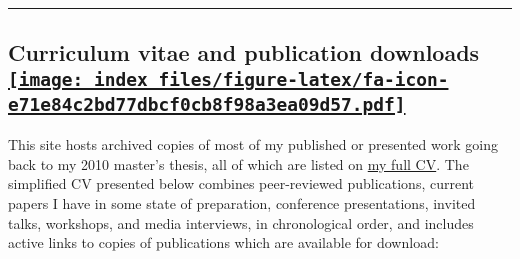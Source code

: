 \documentclass[
]{article}
\begin{document}
\begin{center}\rule{0.5\linewidth}{0.5pt}\end{center}

\hypertarget{cv}{%
\subsection[Curriculum vitae and publication downloads
]{\texorpdfstring{Curriculum vitae and publication downloads
\href{pdf/OnossonCV.pdf}{\protect\texttt{[image: index\_files/figure-latex/fa-icon-e71e84c2bd77dbcf0cb8f98a3ea09d57.pdf]}}}{Curriculum vitae and publication downloads }}\label{cv}}

This site hosts archived copies of most of my published or presented
work going back to my 2010 master's thesis, all of which are listed on
\href{pdf/OnossonCV.pdf}{my full CV}. The simplified CV presented below
combines peer-reviewed publications, current papers I have in some state
of preparation, conference presentations, invited talks, workshops, and
media interviews, in chronological order, and includes active links to
copies of publications which are available for download:
\end{document}
